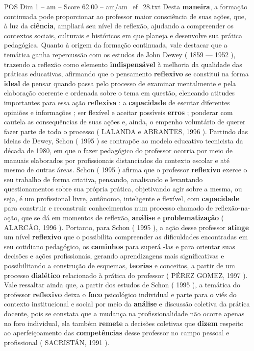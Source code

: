 \begin{textsample}{POS Dim 1 – am – Score 62.00 – am/am\_ef\_28.txt}
Desta \textbf{maneira}, a formação continuada pode proporcionar ao professor maior consciência de suas ações, que, à luz da \textbf{ciência}, ampliará seu nível de reflexão, ajudando a compreender os contextos sociais, culturais e históricos em que planeja e desenvolve sua prática pedagógica.
Quanto à origem da formação continuada, vale destacar que a temática ganha repercussão com os estudos de John Dewey ( 1859 — 1952 ), trazendo a reflexão como elemento \textbf{indispensável} à melhoria da qualidade das práticas educativas, afirmando que o pensamento \textbf{reflexivo} se constitui na forma \textbf{ideal} de pensar quando passa pelo processo de examinar mentalmente e pela elaboração coerente e ordenada sobre o tema em questão, elencando atitudes importantes para essa ação \textbf{reflexiva} : a \textbf{capacidade} de escutar diferentes opiniões e informações ; ser flexível e aceitar possíveis \textbf{erros} ; ponderar com cautela as consequências de suas ações e, ainda, o empenho voluntário de querer fazer parte de todo o processo ( LALANDA e ABRANTES, 1996 ).
Partindo das ideias de Dewey, Schon ( 1995 ) se contrapõe ao modelo educativo tecnicista da década de 1980, em que o fazer pedagógico do professor ocorria por meio de manuais elaborados por profissionais distanciados do contexto escolar e até mesmo de outras áreas.
Schon ( 1995 ) afirma que o professor \textbf{reflexivo} exerce o seu trabalho de forma criativa, pensando, analisando e levantando questionamentos sobre sua própria prática, objetivando agir sobre a mesma, ou seja, é um profissional livre, autônomo, inteligente e flexível, com \textbf{capacidade} para construir e reconstruir conhecimentos num processo chamado de reflexão-na-ação, que se dá em momentos de reflexão, \textbf{análise} e \textbf{problematização} ( ALARCÃO, 1996 ).
Portanto, para Schon ( 1995 ), a ação desse professor \textbf{atinge} um nível \textbf{reflexivo} que o possibilita compreender as dificuldades encontradas em seu cotidiano pedagógico, os \textbf{caminhos} para superá -las e para orientar suas decisões e ações profissionais, gerando aprendizagens mais significativas e possibilitando a construção de esquemas, \textbf{teorias} e conceitos, a partir de um processo \textbf{dialético} relacionado à prática do professor ( PÉREZ GOMEZ, 1997 ).
Vale ressaltar ainda que, a partir dos estudos de Schon ( 1995 ), a temática do professor \textbf{reflexivo} deixa o \textbf{foco} psicológico individual e parte para o viés do contexto institucional e social por meio da \textbf{análise} e discussão coletiva da prática docente, pois se constata que a mudança na profissionalidade não ocorre apenas no foro individual, ela também \textbf{remete} a decisões coletivas que \textbf{dizem} respeito ao aperfeiçoamento das \textbf{competências} desse professor no campo pessoal e profissional ( SACRISTÁN, 1991 ).

\end{textsample}
